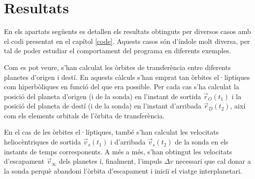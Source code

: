 \chapter{Resultats}
En els apartats següents es detallen els resultats obtinguts per diversos casos amb el codi presentat en el capítol \ref{code}. Aquests casos són d'índole molt diversa, per tal de poder estudiar el comportament del programa en diferents exemples.

Com es pot veure, s'han calculat les òrbites de transferència entre diferents planetes d'origen i destí. En aquests càlculs s'han emprat tan òrbites el·líptiques com hiperbòliques en funció del que era possible. Per cada cas s'ha calculat la posició del planeta d'origen (i de la sonda) en l'instant de sortida $\vec{r}_{O}(t_{1})$ i la posició del planeta de destí (i de la sonda) en l'instant d'arribada $\vec{r}_{D}(t_{2})$, així com els elements orbitals de l'òrbita de transferència.

En el cas de les òrbites el·líptiques, també s'han calculat les velocitats heliocèntriques de sortida $\vec{v}_{s}(t_{1})$ i d'arribada $\vec{v}_{s}(t_{2})$ de la sonda en els instants de temps corresponents. A més a més, s'han obtingut les velocitats d'escapament $\vec{v}_{\infty}$ dels planetes i, finalment, l'impuls $\Delta v$ necessari que cal donar a la sonda perquè abandoni l'òrbita d'escapament i iniciï el viatge interplanetari.
\pagebreak

